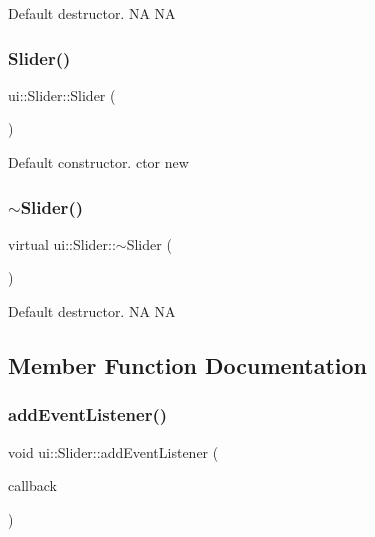 Default destructor.  NA  NA \mbox{\label{classui_1_1Slider_ac4d871719e4de62907d10551f34a36f3}} 
\subsubsection{\texorpdfstring{Slider()}{Slider()}\hspace{0.1cm}{\footnotesize\ttfamily [2/2]}}
{\footnotesize\ttfamily ui\+::\+Slider\+::\+Slider (\begin{DoxyParamCaption}{ }\end{DoxyParamCaption})}

Default constructor.  ctor  new \mbox{\label{classui_1_1Slider_ab68ac1e31c69b3959203174c574b83ee}} 
\subsubsection{\texorpdfstring{$\sim$\+Slider()}{~Slider()}\hspace{0.1cm}{\footnotesize\ttfamily [2/2]}}
{\footnotesize\ttfamily virtual ui\+::\+Slider\+::$\sim$\+Slider (\begin{DoxyParamCaption}{ }\end{DoxyParamCaption})\hspace{0.3cm}{\ttfamily [virtual]}}

Default destructor.  NA  NA 

\subsection{Member Function Documentation}
\mbox{\label{classui_1_1Slider_af03961eee2f27eb9f96a090fb860220f}} 
\subsubsection{\texorpdfstring{add\+Event\+Listener()}{addEventListener()}\hspace{0.1cm}{\footnotesize\ttfamily [1/2]}}
{\footnotesize\ttfamily void ui\+::\+Slider\+::add\+Event\+Listener (\begin{DoxyParamCaption}\item[{const cc\+Slider\+Callback \&}]{callback }\end{DoxyParamCaption})}

